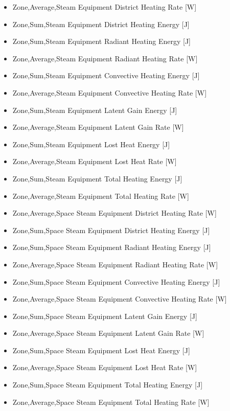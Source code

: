 \begin{itemize}
\item
  Zone,Average,Steam Equipment District Heating Rate {[}W{]}
\item
  Zone,Sum,Steam Equipment District Heating Energy {[}J{]}
\item
  Zone,Sum,Steam Equipment Radiant Heating Energy {[}J{]}
\item
  Zone,Average,Steam Equipment Radiant Heating Rate {[}W{]}
\item
  Zone,Sum,Steam Equipment Convective Heating Energy {[}J{]}
\item
  Zone,Average,Steam Equipment Convective Heating Rate {[}W{]}
\item
  Zone,Sum,Steam Equipment Latent Gain Energy {[}J{]}
\item
  Zone,Average,Steam Equipment Latent Gain Rate {[}W{]}
\item
  Zone,Sum,Steam Equipment Lost Heat Energy {[}J{]}
\item
  Zone,Average,Steam Equipment Lost Heat Rate {[}W{]}
\item
  Zone,Sum,Steam Equipment Total Heating Energy {[}J{]}
\item
  Zone,Average,Steam Equipment Total Heating Rate {[}W{]}
\item
  Zone,Average,Space Steam Equipment District Heating Rate {[}W{]}
\item
  Zone,Sum,Space Steam Equipment District Heating Energy {[}J{]}
\item
  Zone,Sum,Space Steam Equipment Radiant Heating Energy {[}J{]}
\item
  Zone,Average,Space Steam Equipment Radiant Heating Rate {[}W{]}
\item
  Zone,Sum,Space Steam Equipment Convective Heating Energy {[}J{]}
\item
  Zone,Average,Space Steam Equipment Convective Heating Rate {[}W{]}
\item
  Zone,Sum,Space Steam Equipment Latent Gain Energy {[}J{]}
\item
  Zone,Average,Space Steam Equipment Latent Gain Rate {[}W{]}
\item
  Zone,Sum,Space Steam Equipment Lost Heat Energy {[}J{]}
\item
  Zone,Average,Space Steam Equipment Lost Heat Rate {[}W{]}
\item
  Zone,Sum,Space Steam Equipment Total Heating Energy {[}J{]}
\item
  Zone,Average,Space Steam Equipment Total Heating Rate {[}W{]}

\end{itemize}
